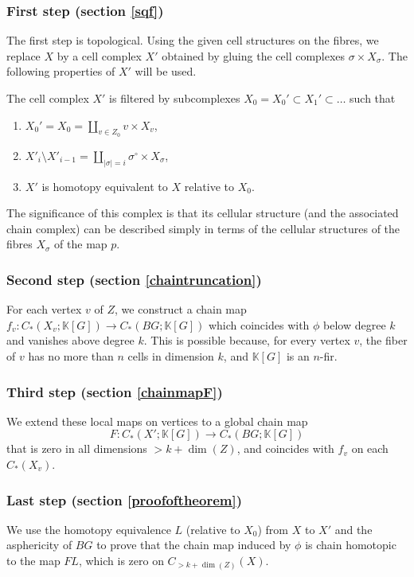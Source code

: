 \documentclass[11pt,letterpaper]{amsart}
\begin{document}
\subsubsection*{First step (section \ref{sqf})} The first step is topological. Using the given cell structures on the fibres, we replace $X$ by a cell complex $X'$ obtained by gluing the cell complexes $\sigma\times X_{\sigma}$. The following properties of $X'$ will be used. 

The cell complex $X'$ is filtered by subcomplexes $X_0=X_0'\subset X_1'\subset\dots$ such that 
\begin{enumerate}
\item 
$X_0'=X_0=\coprod_{v\in Z_0}v\times X_v$,
\item
$X'_i\setminus X'_{i-1}=\coprod_{|\sigma|=i}\sigma^{\circ}\times X_{\sigma}$,
\item 
$X'$ is homotopy equivalent to $X$ relative to $X_0.$
\end{enumerate}
The significance of this complex is that its cellular structure (and the associated chain complex) can be described simply in terms of the cellular structures of the fibres $X_{\sigma}$ of the map $p$. 
\subsubsection*{Second step (section \ref{chaintruncation})} For each vertex $v$ of $Z$, we construct a chain map $f_v:C_*(X_v;\mathbb K[G])\rightarrow C_*(BG;\mathbb K[G])$ which coincides with $\phi$ below degree $k$ and vanishes above degree $k$. This is possible because, for every vertex $v$, the fiber of $v$ has no more than $n$ cells in dimension $k$, and $\mathbb K[G]$ is an $n$-fir. 
\subsubsection*{Third step (section \ref{chainmapF})} We %
extend these local maps on vertices to a global chain map 
$$
F:C_*(X';\mathbb K[G])\rightarrow C_*(BG;\mathbb K[G])
$$
that is zero in all dimensions $>k+\dim(Z)$, and coincides with $f_v$ on each $C_*(X_v)$.%
\subsubsection*{Last step (section \ref{proofoftheorem})} We use the homotopy equivalence $L$ (relative to $X_0$) from $X$ to $X'$ and the asphericity of $BG$ to prove that the chain map induced by $\phi$ is chain homotopic to the map $FL$, which is zero on $C_{>k+\dim(Z)}(X)$.
\end{document}
